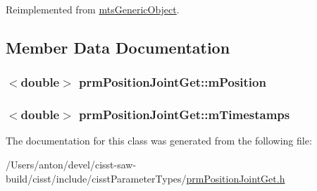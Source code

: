 Reimplemented from \hyperlink{classmts_generic_object_a4916a6c62ee5b167d7c93c88ab72523a}{mts\+Generic\+Object}.



\subsection{Member Data Documentation}
\hypertarget{classprm_position_joint_get_a9a7bd809fc2805e1902de89a108331ca}{}
\subsubsection[{m\+Position}]{$<$double$>$ prm\+Position\+Joint\+Get\+::m\+Position\hspace{0.3cm}{\ttfamily [protected]}}\label{classprm_position_joint_get_a9a7bd809fc2805e1902de89a108331ca}
\hypertarget{classprm_position_joint_get_a1a391f7e9a645609367916dc2ae7683c}{}
\subsubsection[{m\+Timestamps}]{$<$double$>$ prm\+Position\+Joint\+Get\+::m\+Timestamps\hspace{0.3cm}{\ttfamily [protected]}}\label{classprm_position_joint_get_a1a391f7e9a645609367916dc2ae7683c}


The documentation for this class was generated from the following file\+:\begin{DoxyCompactItemize}
\item 
/\+Users/anton/devel/cisst-\/saw-\/build/cisst/include/cisst\+Parameter\+Types/\hyperlink{prm_position_joint_get_8h}{prm\+Position\+Joint\+Get.\+h}\end{DoxyCompactItemize}

